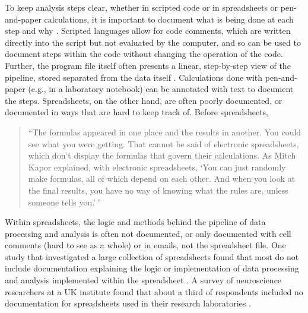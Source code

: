 \documentclass[]{tufte-book}
\begin{document}
To keep analysis steps clear, whether in scripted code or in spreadsheets or
pen-and-paper calculations, it is important to document what is being done at
each step and why \citep{goodman2014ten}. Scripted languages allow for code comments,
which are written directly into the script but not evaluated by the computer,
and so can be used to document steps within the code without changing the
operation of the code. Further, the program file itself often presents a linear,
step-by-step view of the pipeline, stored separated from the data itself
\citep{creeth1985microcomputer}. Calculations done with pen-and-paper (e.g., in a
laboratory notebook) can be annotated with text to document the steps.
Spreadsheets, on the other hand, are often poorly documented, or documented in
ways that are hard to keep track of. Before spreadsheets,

\begin{quote}
``The formulas appeared in one place and the results in another. You could see
what you were getting. That cannot be said of electronic spreadsheets, which
don't display the formulas that govern their calculations. As Mitch Kapor
explained, with electronic spreadsheets, `You can just randomly make formulas,
all of which depend on each other. And when you look at the final results, you
have no way of knowing what the rules are, unless someone tells you.'\,''
\citep{levy1984spreadsheet}
\end{quote}

Within spreadsheets, the logic and methods behind the pipeline of data
processing and analysis is often not documented, or only documented with cell
comments (hard to see as a whole) or in emails, not the spreadsheet file.
One study that investigated a large collection of spreadsheets found that most
do not include documentation explaining the logic or implementation of data
processing and analysis implemented within the spreadsheet
\citep{hermans2016spreadsheets}. A survey of neuroscience researchers at a UK
institute found that about a third of respondents included no documentation
for spreadsheets used in their research laboratories \citep{altarawneh2017pilot}.
\end{document}
